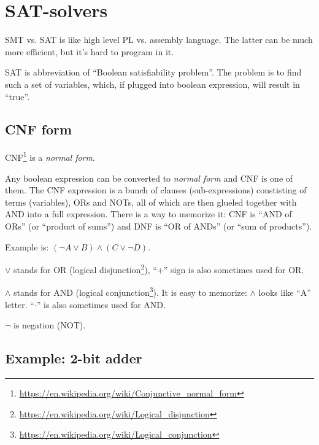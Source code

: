 \section{\ac{SAT}-solvers}

SMT vs. SAT is like high level \ac{PL} vs. assembly language.
The latter can be much more efficient, but it's hard to program in it.

SAT is abbreviation of ``Boolean satisfiability problem''.
The problem is to find such a set of variables, which, if plugged into boolean expression, will result in ``true''.

\subsection{CNF form}

\ac{CNF}\footnote{\url{https://en.wikipedia.org/wiki/Conjunctive_normal_form}} is a \textit{normal form}.


Any boolean expression can be converted to \textit{normal form} and \ac{CNF} is one of them.
The \ac{CNF} expression is a bunch of clauses (sub-expressions) constisting of terms (variables), ORs and NOTs, 
all of which are then glueled together with AND into a full expression.
There is a way to memorize it: \ac{CNF} is ``AND of ORs'' (or ``product of sums'') and \ac{DNF} is ``OR of ANDs'' (or ``sum of products'').

Example is: $(\neg A \vee B) \wedge (C \vee \neg D)$.

$\vee$ stands for OR (logical disjunction\footnote{\url{https://en.wikipedia.org/wiki/Logical_disjunction}}), 
``+'' sign is also sometimes used for OR.

$\wedge$ stands for AND (logical conjunction\footnote{\url{https://en.wikipedia.org/wiki/Logical_conjunction}}).
It is easy to memorize: $\wedge$ looks like ``A'' letter.
``$\cdot$'' is also sometimes used for AND.

$\neg$ is negation (NOT).


\subsection{Example: 2-bit adder}
\label{adder}

